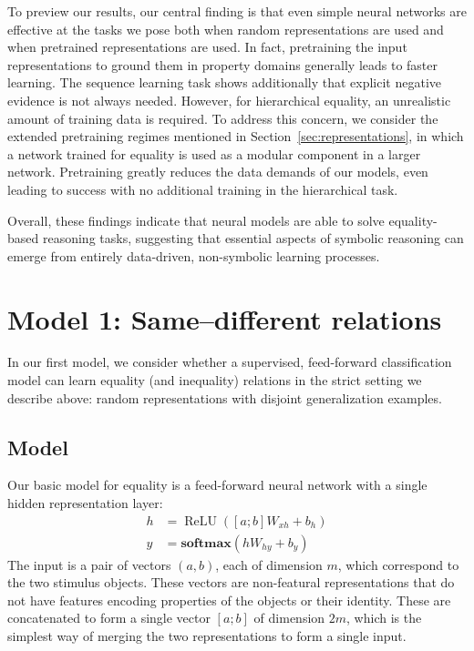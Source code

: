 \documentclass[9pt,twocolumn,twoside,lineno]{pnas-new}
\newcommand{\secref}[1]{Section~\ref{#1}}
\newcommand{\update}[1]{{\color{darkblue}#1}}
\newcommand{\softmax}{\mathbf{softmax}}
\DeclareMathOperator{\ReLU}{ReLU}
\begin{document}
To preview our results, our central finding is that even simple neural networks are effective at the tasks we pose both when random representations are used and when pretrained representations are used. In fact, \update{ pretraining the input representations to ground them in property domains generally leads to faster learning}.  The sequence learning task shows additionally that explicit negative evidence is not always needed. However, for hierarchical equality, an unrealistic amount of training data is required. To address this concern, we consider the \update{extended pretraining regimes mentioned in \secref{sec:representations}, in which a network trained for equality is used as a modular component in a larger network.} Pretraining greatly reduces the data demands of our models, even leading to success with no additional training in the hierarchical task.

Overall, these findings indicate that neural models are able to solve equality-based reasoning tasks, suggesting that essential aspects of symbolic reasoning can emerge from entirely data-driven, non-symbolic learning processes.


\section*{Model 1: Same--different relations}\label{sec:equality}

In our first model, we consider whether a supervised, feed-forward classification model can learn equality (and inequality) relations in the strict setting we describe above: random representations with disjoint generalization examples.


\subsection*{Model}

Our basic model for equality is a feed-forward neural network with a single hidden representation layer:
%
\begin{align}
h &= \ReLU([a;b]W_{xh} + b_{h}) \label{eq:x2h}\\
y &= \softmax(hW_{hy} + b_{y}) \label{eq:h2y}
\end{align}
%
The input is a pair of vectors $(a, b)$, each of dimension $m$, which correspond to the two stimulus objects. These vectors are non-featural representations that do not have features encoding properties of the objects or their identity. These are concatenated to form a single vector $[a;b]$ of dimension $2m$, which is the simplest way of merging the two representations to form a single input.
\end{document}
